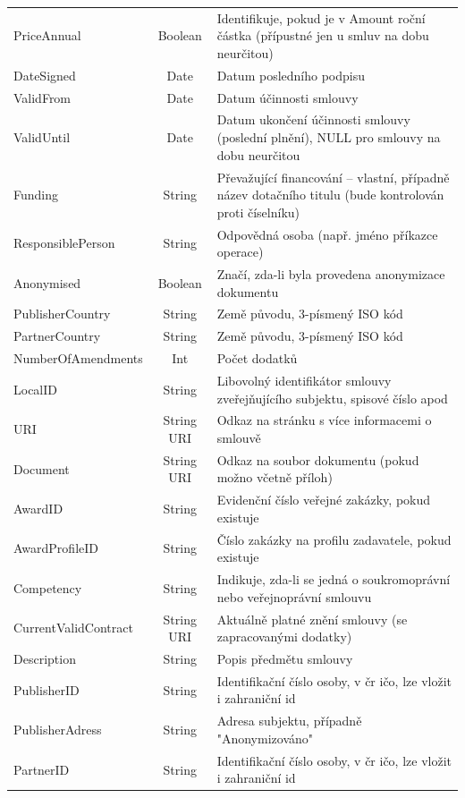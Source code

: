\begin{center}
\begin{longtable}{lcp{65mm}}
PriceAnnual & Boolean & Identifikuje, pokud je v Amount roční částka (přípustné jen u smluv na dobu neurčitou) \\
\rowcolor{validateC}DateSigned & Date & Datum posledního podpisu \\
\rowcolor{validateC}ValidFrom & Date & Datum účinnosti smlouvy \\
\rowcolor{validateC}ValidUntil & Date & Datum ukončení účinnosti smlouvy (poslední plnění), NULL pro smlouvy na dobu neurčitou \\
Funding & String & Převažující financování – vlastní, případně název dotačního titulu (bude kontrolován proti číselníku) \\
ResponsiblePerson & String & Odpovědná osoba (např. jméno příkazce operace) \\
Anonymised & Boolean & Značí, zda-li byla provedena anonymizace dokumentu \\
\rowcolor{validateC}PublisherCountry & String & Země původu, 3-písmený ISO kód \\
\rowcolor{validateC}PartnerCountry & String & Země původu, 3-písmený ISO kód \\
NumberOfAmendments & Int & Počet dodatků \\
LocalID & String & Libovolný identifikátor smlouvy zveřejňujícího subjektu, spisové číslo apod \\
URI & String URI & Odkaz na stránku s více informacemi o smlouvě \\
Document & String URI & Odkaz na soubor dokumentu (pokud možno včetně příloh) \\
\rowcolor{validateC}AwardID & String & Evidenční číslo veřejné zakázky, pokud existuje \\
\rowcolor{validateC}AwardProfileID & String & Číslo zakázky na profilu zadavatele, pokud existuje \\
Competency & String & Indikuje, zda-li se jedná o soukromoprávní nebo veřejnoprávní smlouvu \\
CurrentValidContract & String URI & Aktuálně platné znění smlouvy (se zapracovanými dodatky) \\
Description & String & Popis předmětu smlouvy \\
\rowcolor{validateC}PublisherID & String & Identifikační číslo osoby, v čr ičo, lze vložit i zahraniční id \\
PublisherAdress & String & Adresa subjektu, případně "Anonymizováno" \\
\rowcolor{validateC}PartnerID & String & Identifikační číslo osoby, v čr ičo, lze vložit i zahraniční id \\

\end{longtable}
\end{center}
